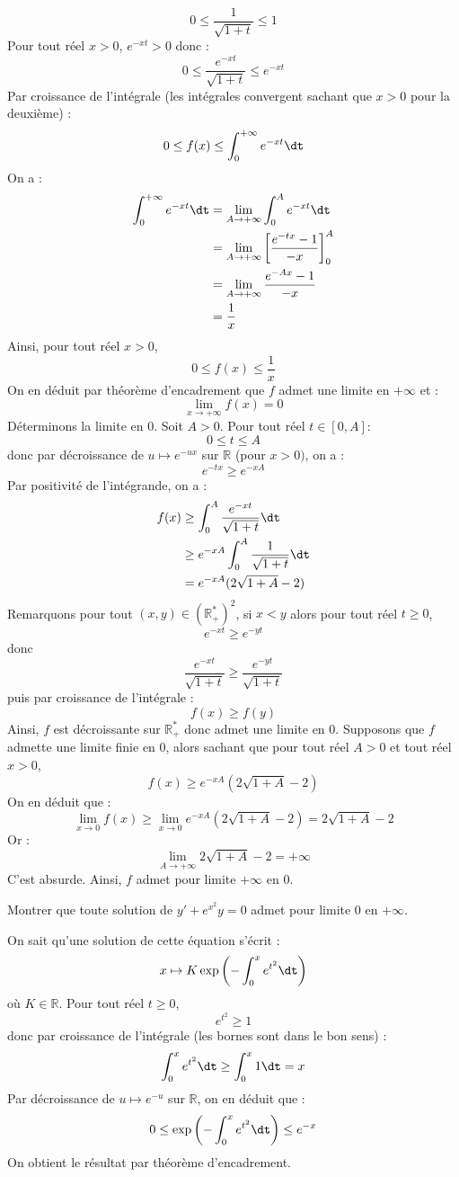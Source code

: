 \documentclass[a4paper,10pt]{report}
\begin{document}
\begin{enumerate}
$$ 0 \leq \dfrac{1}{\sqrt{1+t}} \leq 1$$
Pour tout réel $x>0$, $e^{-xt} > 0$ donc :
$$  0 \leq \dfrac{e^{-xt}}{\sqrt{1+t}} \leq e^{-xt}$$
Par croissance de l'intégrale (les intégrales convergent sachant que $x>0$ pour la deuxième) :
$$ 0 \leq f(x) \leq \int_0^{+ \infty} e^{-xt} \dt$$
On a :
\begin{align*}
\int_0^{+ \infty} e^{-xt} \dt & =\lim_{A \rightarrow + \infty} \int_0^{A} e^{-xt} \dt \\
& = \lim_{A \rightarrow + \infty} \left[ \dfrac{e^{-tx}-1}{-x} \right]_0^A \\
&  = \lim_{A \rightarrow + \infty} \dfrac{e^{-Ax}-1}{-x} \\
& = \dfrac{1}{x}
\end{align*}
Ainsi, pour tout réel $x>0$,
$$ 0 \leq f(x) \leq \dfrac{1}{x}$$
On en déduit par théorème d'encadrement que $f$ admet une limite en $+ \infty$ et :
$$ \lim_{x \rightarrow + \infty} f(x) = 0$$
Déterminons la limite en $0$. Soit $A >0$. Pour tout réel $t \in [0,A]$:
$$ 0 \leq t \leq A$$
donc par décroissance de $u \mapsto e^{-ux}$ sur $\mathbb{R}$ (pour $x>0)$, on a :
$$  e^{-tx} \geq  e^{-xA}$$
Par positivité de l'intégrande, on a :
\begin{align*}
 f(x) & \geq \int_0^{A} \dfrac{e^{-xt}}{\sqrt{1+t}}  \dt  \\
 & \geq e^{-xA} \int_0^A \dfrac{1}{\sqrt{1+t}}  \dt  \\ 
 & = e^{-xA} (2 \sqrt{1+A}-2) 
\end{align*}
Remarquons pour tout $(x,y) \in (\mathbb{R}_+^*)^2$, si $x<y$ alors pour tout réel $t \geq 0$,
$$ e^{-xt} \geq e^{-yt}$$
donc 
$$ \dfrac{e^{-xt}}{\sqrt{1+t}} \geq \dfrac{e^{-yt}}{\sqrt{1+t}}$$
puis par croissance de l'intégrale :
$$ f(x) \geq f(y)$$
Ainsi, $f$ est décroissante sur $\mathbb{R}_+^*$ donc admet une limite en $0$. Supposons que $f$ admette une limite finie en $0$, alors sachant que pour tout réel $A>0$ et tout réel $x>0$,
$$ f(x) \geq  e^{-xA} (2 \sqrt{1+A}-2) $$
On en déduit que :
$$ \lim_{x \rightarrow 0} f(x) \geq \lim_{x \rightarrow 0} e^{-xA} (2 \sqrt{1+A}-2) = 2 \sqrt{1+A}-2$$
Or :
$$ \lim_{A \rightarrow + \infty} 2 \sqrt{1+A}-2 = + \infty$$
C'est absurde. Ainsi, $f$ admet pour limite $+ \infty$ en $0$.
\end{enumerate}

\begin{Exercice}{} Montrer que toute solution de $y'+ e^{x^2} y=0$ admet pour limite $0$ en $+ \infty$.
\end{Exercice}

\corr On sait qu'une solution de cette équation s'écrit :
$$x \mapsto K \exp \left( - \int_0^x e^{t^2} \dt \right)$$
où $K \in \mathbb{R}$. Pour tout réel $t \geq 0$,
$$ e^{t^2} \geq 1$$
donc par croissance de l'intégrale (les bornes sont dans le bon sens) :
$$ \int_0^x e^{t^2} \dt \geq \int_0^x 1 \dt = x$$
Par décroissance de $u \mapsto e^{-u}$ sur $\mathbb{R}$, on en déduit que :
$$  0 \leq \exp \left( - \int_0^x e^{t^2} \dt \right) \leq e^{-x}$$
On obtient le résultat par théorème d'encadrement.
\end{document}
